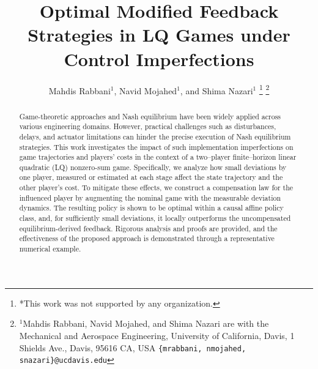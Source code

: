 \documentclass[letterpaper, 10 pt, conference]{ieeeconf}  %
\title{\LARGE \bf
Optimal Modified Feedback Strategies in LQ Games under Control Imperfections
}
\author{Mahdis Rabbani$^{1}$, Navid Mojahed$^{1}$, and Shima Nazari$^{1}$%
\thanks{*This work was not supported by any organization.}%
\thanks{$^{1}$Mahdis Rabbani, Navid Mojahed, and Shima Nazari are with the Mechanical and Aerospace Engineering,
        University of California, Davis, 1 Shields Ave., Davis, 95616 CA, USA
        {\tt\small \{mrabbani, nmojahed, snazari\}@ucdavis.edu}}%
}
\begin{document}
\addtolength{\topmargin}{2mm}   %

\maketitle
\thispagestyle{empty}
\pagestyle{empty}

\begin{abstract}
Game-theoretic approaches and Nash equilibrium have been widely applied across various engineering domains. However, practical challenges such as disturbances, delays, and actuator limitations can hinder the precise execution of Nash equilibrium strategies. This work investigates the impact of such implementation imperfections on game trajectories and players' costs in the context of a two--player finite--horizon linear quadratic (LQ) nonzero-sum game. Specifically, we analyze how small deviations by one player, measured or estimated at each stage affect the state trajectory and the other player’s cost. To mitigate these effects, we construct a compensation law for the influenced player by augmenting the nominal game with the measurable deviation dynamics. The resulting policy is
shown to be optimal within a causal affine policy class, and,
for sufficiently small deviations, it locally outperforms the
uncompensated equilibrium-derived feedback. Rigorous analysis
and proofs are provided, and the effectiveness of the proposed
approach is demonstrated through a representative numerical
example.



\end{abstract}
\end{document}
